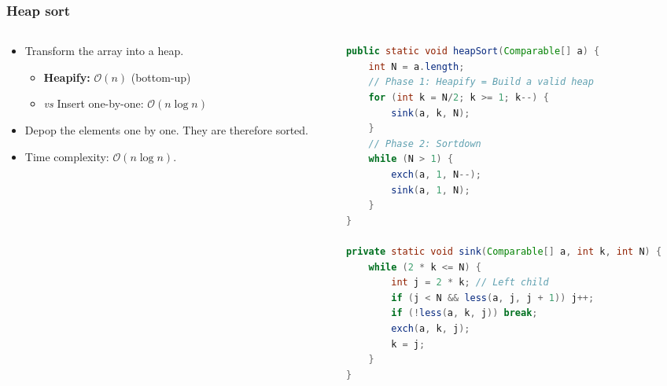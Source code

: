 \documentclass[8pt,aspectratio=169]{beamer}
\begin{document}
\begin{frame}[fragile]
\frametitle{Heap sort}

\begin{columns}[T]
    \begin{column}{0.45\textwidth}
        \begin{itemize}
            \item Transform the array into a heap.
            \begin{itemize}
                \item \textbf{Heapify:} $\mathcal{O}(n)$ (bottom-up)
                \item \textit{vs} Insert one-by-one: $\mathcal{O}(n\log n)$
            \end{itemize}
            \item Depop the elements one by one. They are therefore sorted.
            \item Time complexity: $\mathcal{O}(n\log n)$.
        \end{itemize}
    \end{column}

    \begin{column}{0.5\textwidth}
\begin{lstlisting}[language=Java, basicstyle=\tiny\ttfamily, keywordstyle=\color{blue}, frame=single]
public static void heapSort(Comparable[] a) {
    int N = a.length;
    // Phase 1: Heapify = Build a valid heap
    for (int k = N/2; k >= 1; k--) {
        sink(a, k, N);
    }
    // Phase 2: Sortdown
    while (N > 1) {
        exch(a, 1, N--);
        sink(a, 1, N);
    }
}

private static void sink(Comparable[] a, int k, int N) {
    while (2 * k <= N) {
        int j = 2 * k; // Left child
        if (j < N && less(a, j, j + 1)) j++;
        if (!less(a, k, j)) break;
        exch(a, k, j);
        k = j;
    }
}
\end{lstlisting}
    \end{column}
\end{columns}
\end{frame}
\end{document}
